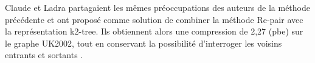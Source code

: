 Claude et Ladra \citep{claude2011practical} partagaient les mêmes préoccupations des auteurs de la méthode précédente et ont proposé comme solution de combiner la méthode Re-pair avec la représentation k2-tree. Ils obtiennent alors une compression de 2,27 (pbe) sur le graphe UK2002, tout en conservant la possibilité d'interroger les voisins entrants et sortants \citep{maneth2015survey}.